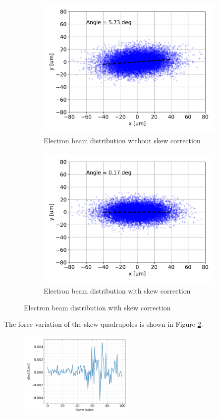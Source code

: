 \documentclass[a4paper,12pt]{article}
\begin{document}
\begin{figure}[H]
\centering
\begin{subfigure}{0.4\textwidth}
\includegraphics[width=1\linewidth, height=7cm]{ebeam_tilted.png} 
\caption{Electron beam distribution without skew correction}
\end{subfigure}
\begin{subfigure}{0.4\textwidth}
\includegraphics[width=1\linewidth, height=7cm]{ebeam_corrected.png}
\caption{Electron beam distribution with skew correction}
\end{subfigure}
\label{fig:model_angle}
\end{figure}


The force variation of the skew quadrupoles is shown in Figure \ref{fig:skew_forces}.

\begin{figure}[H]
\centering
\includegraphics[width=0.5\textwidth]{dskl.png}
\caption{}
\label{fig:skew_forces}
\end{figure}
\end{document}
